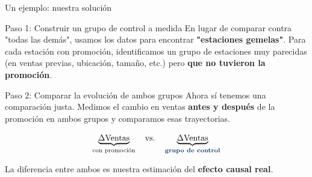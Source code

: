 \documentclass[aspectratio=169]{beamer}
\newcommand{\highlight}[1]{\textcolor{YPFBlue}{\textbf{#1}}}
\begin{document}
\begin{frame}{Un ejemplo: nuestra solución}

\begin{block}{Paso 1: Construir un grupo de control a medida}
\justifying
En lugar de comparar contra "todas las demás", usamos los datos para encontrar \highlight{"estaciones gemelas"}. Para cada estación con promoción, identificamos un grupo de estaciones muy parecidas (en ventas previas, ubicación, tamaño, etc.) pero \highlight{que no tuvieron la promoción}.
\end{block}

\begin{block}{Paso 2: Comparar la evolución de ambos grupos}
\justifying
Ahora sí tenemos una comparación justa. Medimos el cambio en ventas \highlight{antes y después} de la promoción en ambos grupos y comparamos esas trayectorias.
\begin{center}
\large
\[
\underbrace{\Delta \text{Ventas}}_{\text{con promoción}}
\quad \text{vs.} \quad
\underbrace{\Delta \text{Ventas}}_{\text{\highlight{grupo de control}}}
\]
\end{center}
\justifying
La diferencia entre ambos es nuestra estimación del \highlight{efecto causal real}.
\end{block}

\end{frame}
\end{document}
